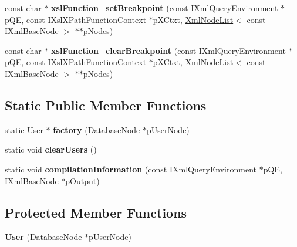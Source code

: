 \begin{DoxyCompactItemize}
\item 
\hypertarget{group__XSLModule-Functions_ga1ca0acb04925cc160fabbad0b85c76a3}{const char $\ast$ {\bfseries xsl\-Function\-\_\-set\-Breakpoint} (const \-I\-Xml\-Query\-Environment $\ast$p\-Q\-E, const \-I\-Xsl\-X\-Path\-Function\-Context $\ast$p\-X\-Ctxt, \hyperlink{classgeneral__server_1_1XmlNodeList}{\-Xml\-Node\-List}$<$ const \-I\-Xml\-Base\-Node $>$ $\ast$$\ast$p\-Nodes)}\label{group__XSLModule-Functions_ga1ca0acb04925cc160fabbad0b85c76a3}

\item 
\hypertarget{group__XSLModule-Functions_gaee3f6e417f2d299f4fefa34c3fa9d9ba}{const char $\ast$ {\bfseries xsl\-Function\-\_\-clear\-Breakpoint} (const \-I\-Xml\-Query\-Environment $\ast$p\-Q\-E, const \-I\-Xsl\-X\-Path\-Function\-Context $\ast$p\-X\-Ctxt, \hyperlink{classgeneral__server_1_1XmlNodeList}{\-Xml\-Node\-List}$<$ const \-I\-Xml\-Base\-Node $>$ $\ast$$\ast$p\-Nodes)}\label{group__XSLModule-Functions_gaee3f6e417f2d299f4fefa34c3fa9d9ba}

\end{DoxyCompactItemize}
\subsection*{\-Static \-Public \-Member \-Functions}
\begin{DoxyCompactItemize}
\item 
\hypertarget{classgeneral__server_1_1User_a72252e1b510fd7f046416531bbb4f377}{static \hyperlink{classgeneral__server_1_1User}{\-User} $\ast$ {\bfseries factory} (\hyperlink{classgeneral__server_1_1DatabaseNode}{\-Database\-Node} $\ast$p\-User\-Node)}\label{classgeneral__server_1_1User_a72252e1b510fd7f046416531bbb4f377}

\item 
\hypertarget{classgeneral__server_1_1User_a655b1c89ed0857eb940a5c5fc6cc1b77}{static void {\bfseries clear\-Users} ()}\label{classgeneral__server_1_1User_a655b1c89ed0857eb940a5c5fc6cc1b77}

\item 
\hypertarget{classgeneral__server_1_1User_ab55cd414057d8966376fbb42ead04d7b}{static void {\bfseries compilation\-Information} (const \-I\-Xml\-Query\-Environment $\ast$p\-Q\-E, \-I\-Xml\-Base\-Node $\ast$p\-Output)}\label{classgeneral__server_1_1User_ab55cd414057d8966376fbb42ead04d7b}

\end{DoxyCompactItemize}
\subsection*{\-Protected \-Member \-Functions}
\begin{DoxyCompactItemize}
\item 
\hypertarget{classgeneral__server_1_1User_a2bf23fd640a06cfad1e0fc3bc0aed47a}{{\bfseries \-User} (\hyperlink{classgeneral__server_1_1DatabaseNode}{\-Database\-Node} $\ast$p\-User\-Node)}\label{classgeneral__server_1_1User_a2bf23fd640a06cfad1e0fc3bc0aed47a}

\end{DoxyCompactItemize}

